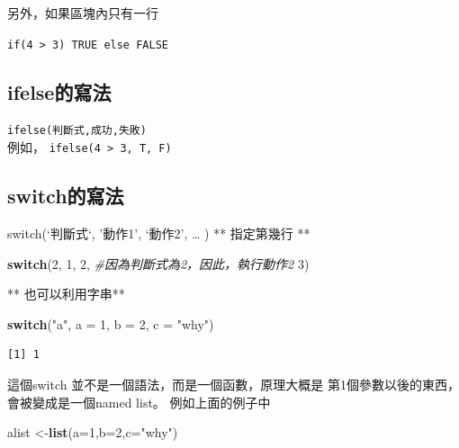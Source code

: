 \documentclass[]{book}
\newenvironment{Shaded}{\begin{snugshade}}{\end{snugshade}}
\newcommand{\CommentTok}[1]{\textcolor[rgb]{0.56,0.35,0.01}{\textit{#1}}}
\newcommand{\ControlFlowTok}[1]{\textcolor[rgb]{0.13,0.29,0.53}{\textbf{#1}}}
\newcommand{\DataTypeTok}[1]{\textcolor[rgb]{0.13,0.29,0.53}{#1}}
\newcommand{\DecValTok}[1]{\textcolor[rgb]{0.00,0.00,0.81}{#1}}
\newcommand{\KeywordTok}[1]{\textcolor[rgb]{0.13,0.29,0.53}{\textbf{#1}}}
\newcommand{\NormalTok}[1]{#1}
\newcommand{\StringTok}[1]{\textcolor[rgb]{0.31,0.60,0.02}{#1}}
\theoremstyle{definition}
\theoremstyle{definition}
\theoremstyle{definition}
\theoremstyle{remark}
\begin{document}
另外，如果區塊內只有一行

\texttt{if(4\ \textgreater{}\ 3)\ TRUE\ else\ FALSE}

\hypertarget{ifelse}{%
\subsection{ifelse的寫法}\label{ifelse}}

\texttt{ifelse(\textquotesingle{}判斷式\textquotesingle{},\textquotesingle{}成功\textquotesingle{},\textquotesingle{}失敗\textquotesingle{})}\\
例如， \texttt{ifelse(4\ \textgreater{}\ 3,\ T,\ F)}

\hypertarget{switch}{%
\subsection{switch的寫法}\label{switch}}

switch(`判斷式`, '動作1', `動作2', \ldots{} ) ** 指定第幾行 **

\begin{Shaded}
\begin{Highlighting}[]
\ControlFlowTok{switch}\NormalTok{(}\DecValTok{2}\NormalTok{, }
       \DecValTok{1}\NormalTok{, }
       \DecValTok{2}\NormalTok{, }\CommentTok{#因為判斷式為2，因此，執行動作2}
       \DecValTok{3}\NormalTok{) }
\end{Highlighting}
\end{Shaded}

** 也可以利用字串**

\begin{Shaded}
\begin{Highlighting}[]
\ControlFlowTok{switch}\NormalTok{(}\StringTok{"a"}\NormalTok{, }
       \DataTypeTok{a =} \DecValTok{1}\NormalTok{,         }
       \DataTypeTok{b =} \DecValTok{2}\NormalTok{,       }
       \DataTypeTok{c =} \StringTok{"why"}\NormalTok{)}
\end{Highlighting}
\end{Shaded}

\begin{verbatim}
[1] 1
\end{verbatim}

這個switch 並不是一個語法，而是一個函數，原理大概是
第1個參數以後的東西，會被變成是一個named list。 例如上面的例子中

\begin{Shaded}
\begin{Highlighting}[]
\NormalTok{alist <-}\KeywordTok{list}\NormalTok{(}\DataTypeTok{a=}\DecValTok{1}\NormalTok{,}\DataTypeTok{b=}\DecValTok{2}\NormalTok{,}\DataTypeTok{c=}\StringTok{"why"}\NormalTok{)}
\end{Highlighting}
\end{Shaded}
\end{document}
